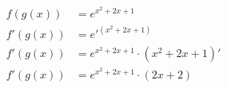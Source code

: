 \documentclass[preview]{standalone}
\begin{document}
\begin{align*}
f(g(x))&=e^{x^2+2x+1}\\ f'(g(x))&=e'^{(x^2+2x+1)}\\ f'(g(x))&=e^{x^2+2x+1} \cdot (x^2+2x+1)'\\ f'(g(x))&=e^{x^2+2x+1} \cdot (2x+2)
\end{align*}
\end{document}
